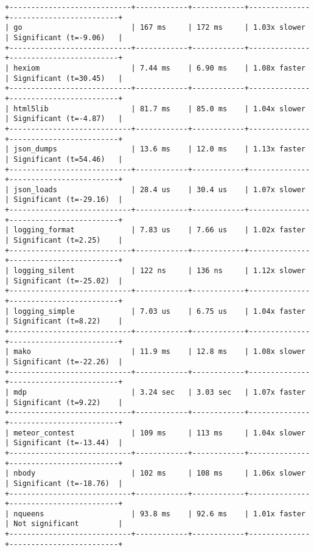 \begin{code}
\begin{verbatim}
+----------------------------+------------+------------+--------------+-------------------------+
| go                         | 167 ms     | 172 ms     | 1.03x slower | Significant (t=-9.06)   |
+----------------------------+------------+------------+--------------+-------------------------+
| hexiom                     | 7.44 ms    | 6.90 ms    | 1.08x faster | Significant (t=30.45)   |
+----------------------------+------------+------------+--------------+-------------------------+
| html5lib                   | 81.7 ms    | 85.0 ms    | 1.04x slower | Significant (t=-4.87)   |
+----------------------------+------------+------------+--------------+-------------------------+
| json_dumps                 | 13.6 ms    | 12.0 ms    | 1.13x faster | Significant (t=54.46)   |
+----------------------------+------------+------------+--------------+-------------------------+
| json_loads                 | 28.4 us    | 30.4 us    | 1.07x slower | Significant (t=-29.16)  |
+----------------------------+------------+------------+--------------+-------------------------+
| logging_format             | 7.83 us    | 7.66 us    | 1.02x faster | Significant (t=2.25)    |
+----------------------------+------------+------------+--------------+-------------------------+
| logging_silent             | 122 ns     | 136 ns     | 1.12x slower | Significant (t=-25.02)  |
+----------------------------+------------+------------+--------------+-------------------------+
| logging_simple             | 7.03 us    | 6.75 us    | 1.04x faster | Significant (t=8.22)    |
+----------------------------+------------+------------+--------------+-------------------------+
| mako                       | 11.9 ms    | 12.8 ms    | 1.08x slower | Significant (t=-22.26)  |
+----------------------------+------------+------------+--------------+-------------------------+
| mdp                        | 3.24 sec   | 3.03 sec   | 1.07x faster | Significant (t=9.22)    |
+----------------------------+------------+------------+--------------+-------------------------+
| meteor_contest             | 109 ms     | 113 ms     | 1.04x slower | Significant (t=-13.44)  |
+----------------------------+------------+------------+--------------+-------------------------+
| nbody                      | 102 ms     | 108 ms     | 1.06x slower | Significant (t=-18.76)  |
+----------------------------+------------+------------+--------------+-------------------------+
| nqueens                    | 93.8 ms    | 92.6 ms    | 1.01x faster | Not significant         |
+----------------------------+------------+------------+--------------+-------------------------+

\end{verbatim}
\end{code}

